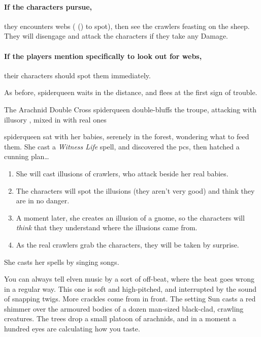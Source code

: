 \paragraph{If the characters pursue,}
they encounters webs ( (\tn[9]) to spot), then see the \glspl{crawler} feasting on the sheep.
They will disengage and attack the characters if they take any Damage.

\paragraph{If the players mention specifically to look out for webs,}
their characters should spot them immediately.


As before, \gls{spiderqueen} waits in the distance, and flees at the first sign of trouble.


{The Arachnid Double Cross}%
{\Gls{spiderqueen} double-bluffs the troupe, attacking with illusory , mixed in with real ones}%
\label{spiderqueenssong}

\Gls{spiderqueen} sat with her babies, serenely in the forest, wondering what to feed them.
She cast a \textit{Witness Life} spell, and discovered the \glspl{pc}, then hatched a cunning plan\ldots

\begin{enumerate}
  \item
    She will cast illusions of \glspl{crawler}, who attack beside her real babies.
  \item
  The characters will spot the illusions (they aren't very good) and think they are in no danger.
  \item
  A moment later, she creates an illusion of a gnome, so the characters will \emph{think} that they understand where the illusions came from.
  \item
  As the real \glspl{crawler} grab the characters, they will be taken by surprise.
\end{enumerate}

She casts her \glspl{spell} by singing songs.

\begin{boxtext}
  You can always tell elven music by a sort of off-beat, where the beat goes wrong in a regular way.
  This one is soft and high-pitched, and interrupted by the sound of snapping twigs.
  More crackles come from in front.
  The setting Sun casts a red shimmer over the armoured bodies of a dozen man-sized black-clad, crawling creatures.
  The trees drop a small platoon of arachnids, and in a moment a hundred eyes are calculating how you taste.
\end{boxtext}


